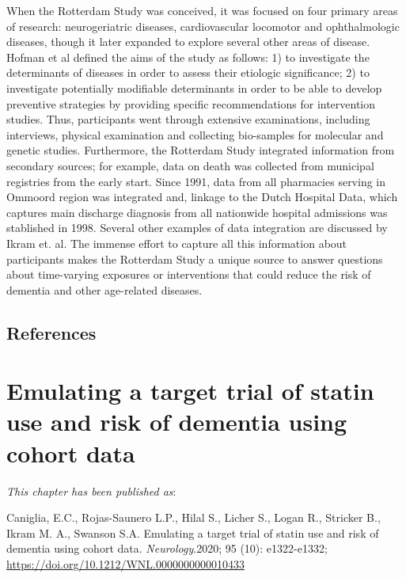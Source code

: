 \documentclass[
]{book}
\begin{document}
When the Rotterdam Study was conceived, it was focused on four primary areas of research: neurogeriatric diseases, cardiovascular locomotor and ophthalmologic diseases, though it later expanded to explore several other areas of disease. Hofman et al defined the aims of the study as follows: 1) to investigate the determinants of diseases in order to assess their etiologic significance; 2) to investigate potentially modifiable determinants in order to be able to develop preventive strategies by providing specific recommendations for intervention studies\autocite{hofman1991}. Thus, participants went through extensive examinations, including interviews, physical examination and collecting bio-samples for molecular and genetic studies. Furthermore, the Rotterdam Study integrated information from secondary sources; for example, data on death was collected from municipal registries from the early start. Since 1991, data from all pharmacies serving in Ommoord region was integrated and, linkage to the Dutch Hospital Data, which captures main discharge diagnosis from all nationwide hospital admissions was stablished in 1998. Several other examples of data integration are discussed by Ikram et. al\autocite{ikram2020}. The immense effort to capture all this information about participants makes the Rotterdam Study a unique source to answer questions about time-varying exposures or interventions that could reduce the risk of dementia and other age-related diseases.

\newpage

\hypertarget{references}{%
\section{References}\label{references}}

\hypertarget{chapter2}{%
\chapter{Emulating a target trial of statin use and risk of dementia using cohort data}\label{chapter2}}

\small

\noindent
\emph{This chapter has been published as}:

Caniglia, E.C., Rojas-Saunero L.P., Hilal S., Licher S., Logan R., Stricker B., Ikram M. A., Swanson S.A. Emulating a target trial of statin use and risk of dementia using cohort data. \emph{Neurology}.2020; 95 (10): e1322-e1332;
\url{https://doi.org/10.1212/WNL.0000000000010433}
\end{document}
